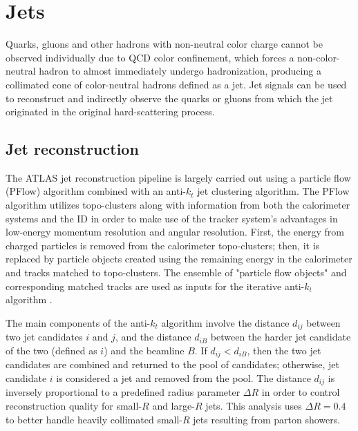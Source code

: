 \documentclass[../thesis.tex]{subfiles}
\begin{document}
\section{Jets}
Quarks, gluons and other hadrons with non-neutral color charge cannot be observed individually due to \acs{QCD} color confinement, which forces a non-color-neutral hadron to almost immediately undergo hadronization, producing a collimated cone of color-neutral hadrons defined as a jet. Jet signals can be used to reconstruct and indirectly observe the quarks or gluons from which the jet originated in the original hard-scattering process.

\subsection{Jet reconstruction}

The ATLAS jet reconstruction pipeline is largely carried out using a particle flow (PFlow) algorithm combined with an anti-$k_t$ jet clustering algorithm. The PFlow algorithm \citep{reco:jet_pflow} utilizes topo-clusters along with information from both the calorimeter systems and the \acs{ID} in order to make use of the tracker system's advantages in low-energy momentum resolution and angular resolution. First, the energy from charged particles is removed from the calorimeter topo-clusters; then, it is replaced by particle objects created using the remaining energy in the calorimeter and tracks matched to topo-clusters. The ensemble of "particle flow objects" and corresponding matched tracks are used as inputs for the iterative anti-$k_t$ algorithm \citep{reco:jet_antikt}.

The main components of the anti-$k_t$ algorithm involve the distance $d_{ij}$ between two jet candidates $i$ and $j$, and the distance $d_{iB}$ between the harder jet candidate of the two (defined as $i$) and the beamline $B$. If $d_{ij} < d_{iB}$, then the two jet candidates are combined and returned to the pool of candidates; otherwise, jet candidate $i$ is considered a jet and removed from the pool. The distance $d_{ij}$ is inversely proportional to a predefined radius parameter $\Delta R$ in order to control reconstruction quality for small-$R$ and large-$R$ jets. This analysis uses $\Delta R=0.4$ to better handle heavily collimated small-$R$ jets resulting from parton showers.
\end{document}
